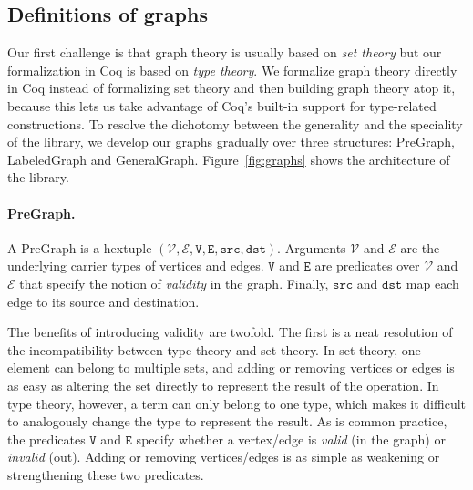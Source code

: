 

\subsection{Definitions of graphs}\label{sec:mathinfra}

Our first challenge is that graph theory is usually based on
\emph{set theory} but our formalization in Coq is
based on \emph{type theory}. We formalize graph theory
directly in Coq instead of formalizing set theory and then building
graph theory atop it, because this lets us take advantage of Coq's built-in
support for type-related constructions.
To resolve the dichotomy between
the generality and the speciality of the library, we develop
our graphs gradually over three structures:
PreGraph, LabeledGraph and GeneralGraph.
Figure~\ref{fig:graphs} shows the
architecture of the library.


\paragraph{PreGraph.}
A PreGraph is a hextuple $(\mathcal{V}, \mathcal{E}, \mathtt{V}, \mathtt{E}, \mathtt{src}, \mathtt{dst})$.  Arguments $\mathcal{V}$ and $\mathcal{E}$ are the underlying
carrier types of vertices and edges.  $\mathtt{V}$ and $\mathtt{E}$ are predicates over
$\mathcal{V}$ and $\mathcal{E}$ that specify the notion
of \emph{validity} in the graph.  Finally, $\mathtt{src}$ and $\mathtt{dst}$ map each edge to
its source and destination.

The benefits of introducing validity are twofold. The first is a
neat resolution of the incompatibility between type theory and set theory.
In set theory, one
element can belong to multiple sets, and
adding or removing vertices or edges is as easy as altering
the set directly to represent the result of the operation.
In type theory, however, a term can only belong
to one type, which makes it difficult
to analogously change the
type to represent the result. As is common practice, the
predicates $\mathtt{V}$ and $\mathtt{E}$ specify whether a vertex/edge is \emph{valid}
(in the graph) or \emph{invalid} (out). Adding or removing vertices/edges
is as simple as weakening or strengthening these two predicates.


